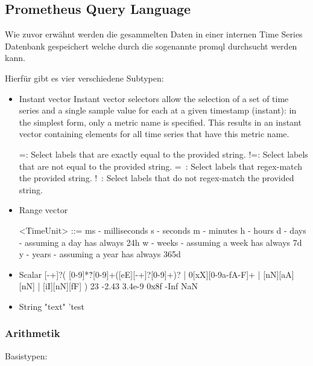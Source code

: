 \subsection{Prometheus Query Language}
Wie zuvor erwähnt werden die gesammelten Daten in einer internen Time Series Datenbank gespeichert welche durch die sogenannte \gls{promql} durchsucht werden kann.

Hierfür gibt es vier verschiedene Subtypen:
\begin{itemize}
	\item Instant vector
	Instant vector selectors allow the selection of a set of time series and a single sample value for each at a given timestamp (instant): in the simplest form, only a metric name is specified. This results in an instant vector containing elements for all time series that have this metric name.
	
	
	=: Select labels that are exactly equal to the provided string.
	!=: Select labels that are not equal to the provided string.
	=~: Select labels that regex-match the provided string.
	!~: Select labels that do not regex-match the provided string.
	
	
	
	\item Range vector
	
	<TimeUnit> ::=
	ms - milliseconds
	s - seconds
	m - minutes
	h - hours
	d - days - assuming a day has always 24h
	w - weeks - assuming a week has always 7d
	y - years - assuming a year has always 365d
	
	
	\item Scalar
	[-+]?(
	[0-9]*\.?[0-9]+([eE][-+]?[0-9]+)?
	| 0[xX][0-9a-fA-F]+
	| [nN][aA][nN]
	| [iI][nN][fF]
	)
	23
	-2.43
	3.4e-9
	0x8f
	-Inf
	NaN
	\item String
	"text"
	'test
\end{itemize}

\subsubsection{Arithmetik}

Basistypen:


